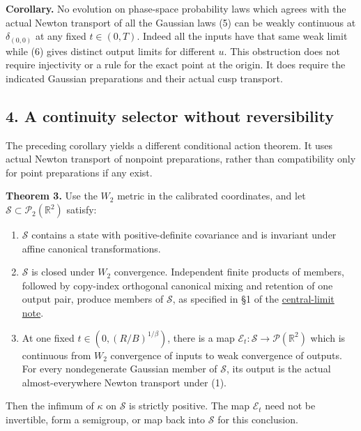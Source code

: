 \documentclass[11pt,a4paper]{article}
\newcommand{\tightlist}{\setlength{\itemsep}{0pt}\setlength{\parskip}{0pt}}
\begin{document}
\textbf{Corollary.} No evolution on phase-space probability laws which
agrees with the actual Newton transport of all the Gaussian laws (5) can
be weakly continuous at \(\delta_{(0,0)}\) at any fixed \(t\in(0,T)\).
Indeed all the inputs have that same weak limit while (6) gives distinct
output limits for different \(u\). This obstruction does not require
injectivity or a rule for the exact point at the origin. It does require
the indicated Gaussian preparations and their actual cusp transport.

\hypertarget{a-continuity-selector-without-reversibility}{%
\subsection{4. A continuity selector without
reversibility}\label{a-continuity-selector-without-reversibility}}

The preceding corollary yields a different conditional action theorem.
It uses actual Newton transport of nonpoint preparations, rather than
compatibility only for point preparations if any exist.

\textbf{Theorem 3.} Use the \(W_2\) metric in the calibrated
coordinates, and let \(\mathcal S\subset\mathcal P_2(\mathbb R^2)\)
satisfy:

\begin{enumerate}
\def\labelenumi{\arabic{enumi}.}
\tightlist
\item
  \(\mathcal S\) contains a state with positive-definite covariance and
  is invariant under affine canonical transformations.
\item
  \(\mathcal S\) is closed under \(W_2\) convergence. Independent finite
  products of members, followed by copy-index orthogonal canonical
  mixing and retention of one output pair, produce members of
  \(\mathcal S\), as specified in §1 of the
  \href{central-limit-canonical-gaussian-sector.md}{central-limit note}.
\item
  At one fixed \(t\in(0,(R/B)^{1/\beta})\), there is a map
  \(\mathcal E_t:\mathcal S\to\mathcal P(\mathbb R^2)\) which is
  continuous from \(W_2\) convergence of inputs to weak convergence of
  outputs. For every nondegenerate Gaussian member of \(\mathcal S\),
  its output is the actual almost-everywhere Newton transport under (1).
\end{enumerate}

Then the infimum of \(\kappa\) on \(\mathcal S\) is strictly positive.
The map \(\mathcal E_t\) need not be invertible, form a semigroup, or
map back into \(\mathcal S\) for this conclusion.
\end{document}
